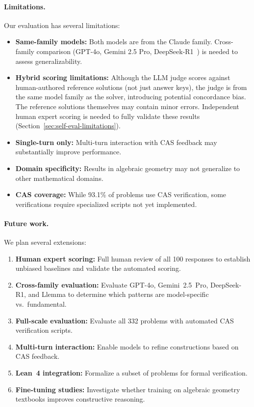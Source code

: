 \paragraph{Limitations.}
Our evaluation has several limitations:
\begin{itemize}[nosep]
  \item \textbf{Same-family models:} Both models are from the Claude family. Cross-family comparison (GPT-4o, Gemini 2.5 Pro, DeepSeek-R1~\citep{deepseek2025r1}) is needed to assess generalizability.
  \item \textbf{Hybrid scoring limitations:} Although the LLM judge scores against human-authored reference solutions (not just answer keys), the judge is from the same model family as the solver, introducing potential concordance bias. The reference solutions themselves may contain minor errors. Independent human expert scoring is needed to fully validate these results (Section~\ref{sec:self-eval-limitations}).
  \item \textbf{Single-turn only:} Multi-turn interaction with CAS feedback may substantially improve performance.
  \item \textbf{Domain specificity:} Results in algebraic geometry may not generalize to other mathematical domains.
  \item \textbf{CAS coverage:} While 93.1\% of problems use CAS verification, some verifications require specialized scripts not yet implemented.
\end{itemize}

\paragraph{Future work.}
We plan several extensions:
\begin{enumerate}[nosep]
  \item \textbf{Human expert scoring:} Full human review of all 100 responses to establish unbiased baselines and validate the automated scoring.
  \item \textbf{Cross-family evaluation:} Evaluate GPT-4o, Gemini~2.5~Pro, DeepSeek-R1, and Llemma \citep{azerbayev2024llemma} to determine which patterns are model-specific vs.\ fundamental.
  \item \textbf{Full-scale evaluation:} Evaluate all 332 problems with automated CAS verification scripts.
  \item \textbf{Multi-turn interaction:} Enable models to refine constructions based on CAS feedback.
  \item \textbf{Lean~4 integration:} Formalize a subset of problems for formal verification.
  \item \textbf{Fine-tuning studies:} Investigate whether training on algebraic geometry textbooks \citep{hartshorne1977algebraic, vakil2017rising, eisenbud1995commutative} improves constructive reasoning.
\end{enumerate}

